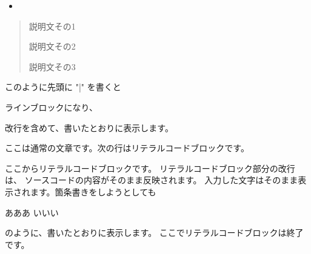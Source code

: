 \documentclass[letterpaper,10pt,dvipdfmx]{sphinxmanual}
\begin{document}
\sphinxAtStartPar
{}
\begin{itemize}
\item {} 
\sphinxAtStartPar
{\hyperref[\detokenize{chap4:onigiri}]{}}

\end{itemize}

\sphinxAtStartPar
{}
\begin{quote}\begin{description}
\sphinxAtStartPar
説明文その1

\sphinxAtStartPar
説明文その2

\sphinxAtStartPar
説明文その3

\end{description}\end{quote}

\begin{DUlineblock}{0em}
\item[] このように先頭に "|" を書くと
\item[] ラインブロックになり、
\item[] 改行を含めて、書いたとおりに表示します。
\end{DUlineblock}

\sphinxAtStartPar
ここは通常の文章です。次の行はリテラルコードブロックです。

\begin{sphinxVerbatim}[commandchars=\\\{\}]
ここからリテラルコードブロックです。
リテラルコードブロック部分の改行は、
ソースコードの内容がそのまま反映されます。
入力した文字はそのまま表示されます。箇条書きをしようとしても

\PYGZhy{} あああ
\PYGZhy{} いいい

のように、書いたとおりに表示します。
ここでリテラルコードブロックは終了です。
\end{sphinxVerbatim}
\end{document}
